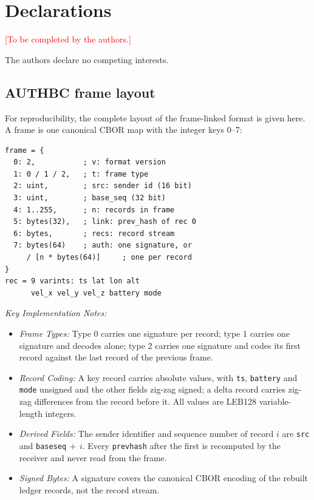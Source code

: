 \documentclass[lineno,pdflatex,sn-mathphys-num]{sn-jnl}
\newcommand{\runin}[1]{\textit{#1:}}
\renewcommand{\_}{\authbcunderscore\allowbreak}
\begin{document}
\backmatter

\section*{Declarations}

 \textcolor{red}{[To be completed by the authors.]}

 The authors declare no competing interests.

\begin{appendices}

\section{AUTHBC frame layout}\label{app:frame}
For reproducibility, the complete layout of the frame-linked format is given here. A frame is one
canonical CBOR map with the integer keys 0--7:
{\footnotesize
\begin{verbatim}
frame = {
  0: 2,           ; v: format version
  1: 0 / 1 / 2,   ; t: frame type
  2: uint,        ; src: sender id (16 bit)
  3: uint,        ; base_seq (32 bit)
  4: 1..255,      ; n: records in frame
  5: bytes(32),   ; link: prev_hash of rec 0
  6: bytes,       ; recs: record stream
  7: bytes(64)    ; auth: one signature, or
     / [n * bytes(64)]     ; one per record
}
rec = 9 varints: ts lat lon alt
      vel_x vel_y vel_z battery mode
\end{verbatim}
}
\runin{Key Implementation Notes}
\begin{itemize}
\item \emph{Frame Types:} Type 0 carries one signature per record; type 1 carries one
signature and decodes alone; type 2 carries one signature and codes its first record against
the last record of the previous frame.
\item \emph{Record Coding:} A key record carries absolute values, with \texttt{ts},
\texttt{battery} and \texttt{mode} unsigned and the other fields zig-zag signed; a delta record
carries zig-zag differences from the record before it. All values are LEB128 variable-length
integers.
\item \emph{Derived Fields:} The sender identifier and sequence number of record $i$ are
\texttt{src} and \texttt{base\_seq}$\,+\,i$. Every \texttt{prev\_hash} after the first is
recomputed by the receiver and never read from the frame.
\item \emph{Signed Bytes:} A signature covers the canonical CBOR encoding of the rebuilt
ledger records, not the record stream.
\end{itemize}


\end{appendices}
\end{document}
